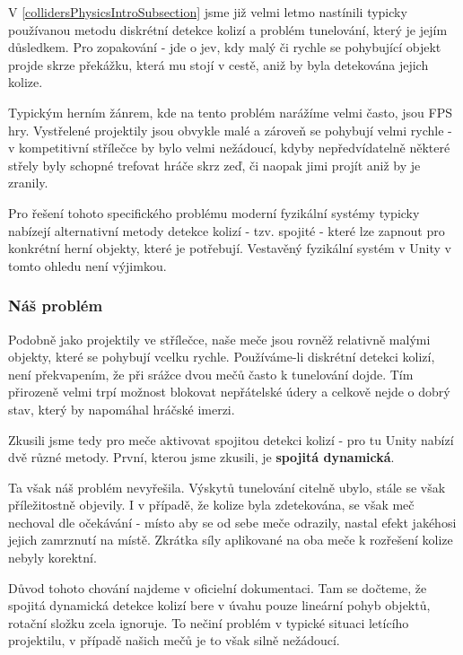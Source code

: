 V \ref{collidersPhysicsIntroSubsection} jsme již velmi letmo nastínili typicky používanou metodu diskrétní detekce kolizí a problém tunelování, který je jejím důsledkem. Pro zopakování - jde o jev, kdy malý či rychle se pohybující objekt projde skrze překážku, která mu stojí v cestě, aniž by byla detekována jejich kolize.

Typickým herním žánrem, kde na tento problém narážíme velmi často, jsou \acs{FPS} hry. Vystřelené projektily jsou obvykle malé a zároveň se pohybují velmi rychle - v kompetitivní střílečce by bylo velmi nežádoucí, kdyby nepředvídatelně některé střely byly schopné trefovat hráče skrz zeď, či naopak jimi projít aniž by je zranily.  

Pro řešení tohoto specifického problému moderní fyzikální systémy typicky nabízejí alternativní metody detekce kolizí - tzv. spojité - které lze zapnout pro konkrétní herní objekty, které je potřebují. Vestavěný fyzikální systém v Unity v tomto ohledu není výjimkou.


\subsubsection*{Náš problém}

Podobně jako projektily ve střílečce, naše meče jsou rovněž relativně malými objekty, které se pohybují vcelku rychle. Používáme-li diskrétní detekci kolizí, není překvapením, že při srážce dvou mečů často k tunelování dojde. Tím přirozeně velmi trpí možnost blokovat nepřátelské údery a celkově nejde o dobrý stav, který by napomáhal hráčské imerzi.

\bigbreak

Zkusili jsme tedy pro meče aktivovat spojitou detekci kolizí - pro tu Unity nabízí dvě různé metody. První, kterou jsme zkusili, je \textbf{spojitá dynamická}.

Ta však náš problém nevyřešila. Výskytů tunelování citelně ubylo, stále se však příležitostně objevily. I v případě, že kolize byla zdetekována, se však meč nechoval dle očekávání - místo aby se od sebe meče odrazily, nastal efekt jakéhosi jejich zamrznutí na místě. Zkrátka síly aplikované na oba meče k rozřešení kolize nebyly korektní.

Důvod tohoto chování najdeme v oficielní dokumentaci. Tam se dočteme, že spojitá dynamická detekce kolizí bere v úvahu pouze lineární pohyb objektů, rotační složku zcela ignoruje. To nečiní problém v typické situaci letícího projektilu, v případě našich mečů je to však silně nežádoucí.  

